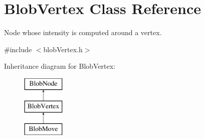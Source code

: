 \hypertarget{class_blob_vertex}{
\section{BlobVertex Class Reference}
\label{class_blob_vertex}
}


Node whose intensity is computed around a vertex.  




{\ttfamily \#include $<$blobVertex.h$>$}

Inheritance diagram for BlobVertex:\begin{figure}[H]
\begin{center}
\leavevmode
\includegraphics[height=3.000000cm]{class_blob_vertex}
\end{center}
\end{figure}
